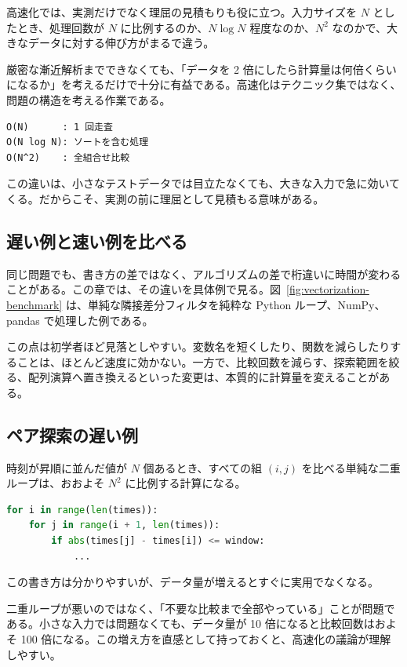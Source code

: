 高速化では、実測だけでなく理屈の見積もりも役に立つ。入力サイズを $N$ としたとき、処理回数が $N$ に比例するのか、$N \log N$ 程度なのか、$N^2$ なのかで、大きなデータに対する伸び方がまるで違う。

厳密な漸近解析までできなくても、「データを 2 倍にしたら計算量は何倍くらいになるか」を考えるだけで十分に有益である。高速化はテクニック集ではなく、問題の構造を考える作業である。

\begin{lstlisting}[numbers=none, xleftmargin=2\zw]
O(N)      : 1 回走査
O(N log N): ソートを含む処理
O(N^2)    : 全組合せ比較
\end{lstlisting}

この違いは、小さなテストデータでは目立たなくても、大きな入力で急に効いてくる。だからこそ、実測の前に理屈として見積もる意味がある。

\subsection{遅い例と速い例を比べる}

同じ問題でも、書き方の差ではなく、アルゴリズムの差で桁違いに時間が変わることがある。この章では、その違いを具体例で見る。図~\ref{fig:vectorization-benchmark} は、単純な隣接差分フィルタを純粋な Python ループ、NumPy、pandas で処理した例である。

この点は初学者ほど見落としやすい。変数名を短くしたり、関数を減らしたりすることは、ほとんど速度に効かない。一方で、比較回数を減らす、探索範囲を絞る、配列演算へ置き換えるといった変更は、本質的に計算量を変えることがある。

\subsection{ペア探索の遅い例}

時刻が昇順に並んだ値が $N$ 個あるとき、すべての組 $(i, j)$ を比べる単純な二重ループは、おおよそ $N^2$ に比例する計算になる。

\begin{lstlisting}[language=Python]
for i in range(len(times)):
    for j in range(i + 1, len(times)):
        if abs(times[j] - times[i]) <= window:
            ...
\end{lstlisting}

この書き方は分かりやすいが、データ量が増えるとすぐに実用でなくなる。

二重ループが悪いのではなく、「不要な比較まで全部やっている」ことが問題である。小さな入力では問題なくても、データ量が 10 倍になると比較回数はおよそ 100 倍になる。この増え方を直感として持っておくと、高速化の議論が理解しやすい。

